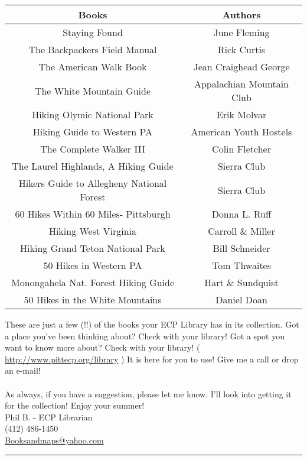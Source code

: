 \documentclass[10pt,a4paper]{article}
\begin{document}
\begin{center}
	\begin{tabular}{|c|c|}
	\hline
\textbf{	Books} & \textbf{Authors}\\ \hline
	Staying Found & June Fleming\\ \hline
The Backpackers Field Manual	&		Rick Curtis\\ \hline
The American Walk Book		&	Jean Craighead George\\ \hline
The White Mountain Guide		&	Appalachian Mountain Club\\ \hline
Hiking Olymic National Park	&		Erik Molvar\\ \hline
Hiking Guide to Western PA	&		American Youth Hostels\\ \hline
The Complete Walker III		&		Colin Fletcher\\ \hline
The Laurel Highlands, A Hiking Guide	 &	Sierra Club\\ \hline
Hikers Guide to Allegheny National Forest &	Sierra Club\\ \hline
60 Hikes Within 60 Miles- Pittsburgh	 &	Donna L. Ruff\\ \hline
Hiking West Virginia	 &			Carroll \& Miller\\ \hline
Hiking Grand Teton National Park	 &	Bill Schneider\\ \hline
50 Hikes in Western PA			&	Tom Thwaites\\ \hline
Monongahela Nat. Forest Hiking Guide	&	Hart \& Sundquist\\ \hline
50 Hikes in the White Mountains	&	Daniel Doan\\ \hline
	\end{tabular}
\end{center}

	These are just a few (!!) of the books your ECP Library has in its collection.   Got a place you've been thinking about?  Check with your library!  Got a spot you want to know more about?  Check with your library! ( \url{http://www.pittecp.org/library} ) It is here for you to use!  Give me a call or drop an e-mail!
\\	
\\
	As always, if you have a suggestion, please let me know.  I'll look into getting it for the collection!  Enjoy your summer!\\
Phil B. - ECP Librarian \\   
(412) 486-1450	\\
\url{Booksandmaps@yahoo.com}
\\
\hrule
\end{document}
